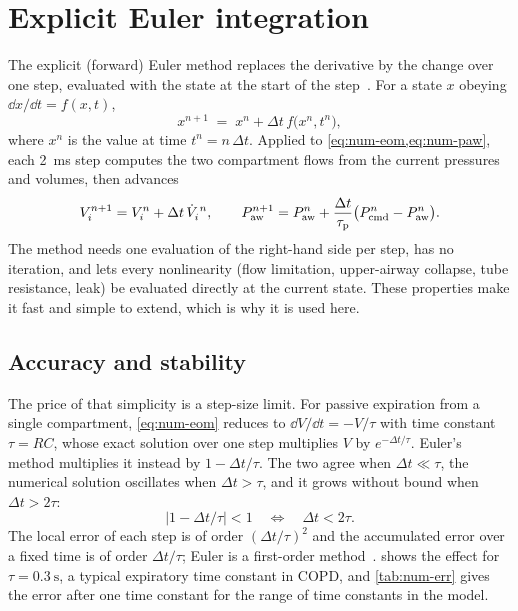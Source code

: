 \section{Explicit Euler integration}
\label{sec:num-euler}
The explicit (forward) Euler method replaces the derivative by the change over one step, evaluated with the state at the start of the step~\citep{butcher2016,hairer1993}. For a state $x$ obeying $\dd x/\dd t = f(x,t)$,
\begin{equation}
x^{n+1} \;=\; x^{n} + \Delta t\, f\bigl(x^{n}, t^{n}\bigr),
\label{eq:num-euler}
\end{equation}
where $x^n$ is the value at time $t^n = n\,\Delta t$. Applied to \cref{eq:num-eom,eq:num-paw}, each \SI{2}{\milli\second} step computes the two compartment flows from the current pressures and volumes, then advances
\begin{equation}
V_i^{n+1} = V_i^{n} + \Delta t\,\dot V_i^{\,n},
\qquad
P_{\mathrm{aw}}^{n+1} = P_{\mathrm{aw}}^{n} + \frac{\Delta t}{\tau_{\mathrm{p}}}\bigl(P_{\mathrm{cmd}}^{n} - P_{\mathrm{aw}}^{n}\bigr).
\label{eq:num-euler-eom}
\end{equation}
The method needs one evaluation of the right-hand side per step, has no iteration, and lets every nonlinearity (flow limitation, upper-airway collapse, tube resistance, leak) be evaluated directly at the current state. These properties make it fast and simple to extend, which is why it is used here.

\subsection{Accuracy and stability}
\label{sec:num-stability}
The price of that simplicity is a step-size limit. For passive expiration from a single compartment, \cref{eq:num-eom} reduces to $\dd V/\dd t = -V/\tau$ with time constant $\tau = RC$, whose exact solution over one step multiplies $V$ by $e^{-\Delta t/\tau}$. Euler's method multiplies it instead by $1 - \Delta t/\tau$. The two agree when $\Delta t \ll \tau$, the numerical solution oscillates when $\Delta t > \tau$, and it grows without bound when $\Delta t > 2\tau$:
\begin{equation}
\bigl|1 - \Delta t/\tau\bigr| < 1 \quad\Longleftrightarrow\quad \Delta t < 2\tau.
\label{eq:num-stab}
\end{equation}
The local error of each step is of order $(\Delta t/\tau)^2$ and the accumulated error over a fixed time is of order $\Delta t/\tau$; Euler is a first-order method~\citep{butcher2016}.  shows the effect for $\tau = \SI{0.3}{\second}$, a typical expiratory time constant in COPD, and \cref{tab:num-err} gives the error after one time constant for the range of time constants in the model.

